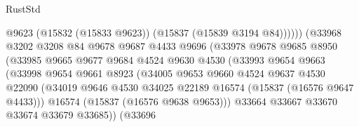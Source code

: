 \begin{lexlean}{RustStd}
\begin{coremodule}
{\begin{coremodule}
{{{{{{{{{{{{{{{{{{{{{{{{{{{{{{{{{{{{{{{{{{{{{{{{{{{{{{{{{{{{                                          @9623
                                          (@15832 (@15833 @9623))
                                          (@15837 (@15839 @3194 @84))))))
                                  (@33968
                                    @3202
                                    @3208
                                    @84
                                    @9678
                                    @9687
                                    @4433
                                    @9696
                                    (@33978
                                      @9678
                                      @9685
                                      @8950
                                      (@33985
                                        @9665
                                        @9677
                                        @9684
                                        @4524
                                        @9630
                                        @4530
                                        (@33993
                                          @9654
                                          @9663
                                          (@33998
                                            @9654
                                            @9661
                                            @8923
                                            (@34005
                                              @9653
                                              @9660
                                              @4524
                                              @9637
                                              @4530
                                              @22090
                                              (@34019
                                                @9646
                                                @4530
                                                @34025
                                                @22189
                                                @16574
                                                (@15837 (@16576 @9647 @4433)))
                                              @16574
                                              (@15837 (@16576 @9638 @9653)))
                                            @33664
                                            @33667
                                            @33670
                                            @33674
                                            @33679
                                            @33685))
                                        (@33696
}}}}}}}}}}}}}}}}}}}}}}}}}}}}}}}}}}}}}}}}}}}}}}}}}}}}}}}}}}}}
\end{coremodule}}
\end{coremodule}
\end{lexlean}
